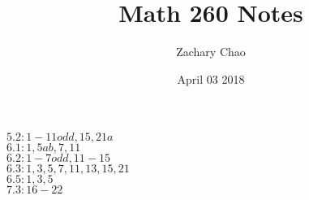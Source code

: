 \documentclass[12pt, letterpaper, twoside]{article}
\title{Math 260 Notes}
\author{Zachary Chao}
\date{April 03 2018}
\begin{document}
$5.2 : 1-11 odd, 15, 21a$\\
$6.1 : 1, 5ab, 7, 11$\\
$6.2 : 1-7odd, 11-15$\\
$6.3 : 1,3,5,7,11,13,15,21$\\
$6.5 : 1,3,5$\\
$7.3 : 16-22$\\
\end{document}
